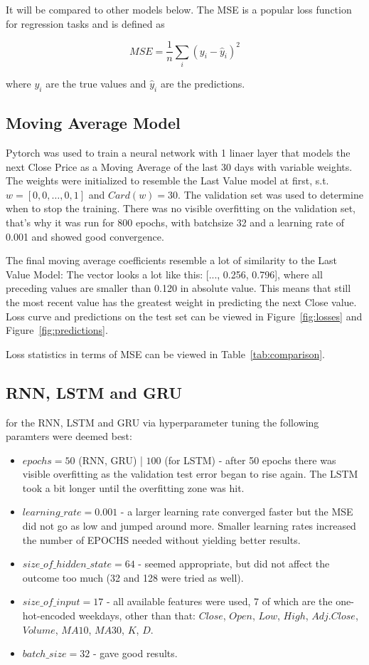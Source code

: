 \documentclass[utf8x]{ctexart}
\begin{document}
It will be compared to other models below.
The MSE is a popular loss function for regression tasks and is defined as

\[ MSE = \frac{1}{n} \sum_i{(y_i - \hat{y}_i)^2}\]

where $y_i$ are the true values and $\hat{y}_i$ are the predictions.

\subsection{Moving Average Model}

Pytorch was used to train a neural network with 1 linaer layer that models the next Close Price as a Moving Average of the last 30 days with variable weights. The weights were initialized to resemble the Last Value model at first, s.t. $w = [0,0,\dots,0,1]$ and $Card(w) = 30$. The validation set was used to determine when to stop the training. There was no visible overfitting on the validation set, that's why it was run for 800 epochs, with batchsize 32 and a learning rate of 0.001 and showed good convergence.

The final moving average coefficients resemble a lot of similarity to the Last Value Model: The vector looks a lot like this: [..., 0.256, 0.796], where all preceding values are smaller than 0.120 in absolute value. This means that still the most recent value has the greatest weight in predicting the next Close value.
Loss curve and predictions on the test set can be viewed in Figure~\ref{fig:losses} and Figure~\ref{fig:predictions}.

Loss statistics in terms of MSE can be viewed in Table~\ref{tab:comparison}.

\subsection{RNN, LSTM and GRU}

for the RNN, LSTM and GRU via hyperparameter tuning the following paramters were deemed best:
\begin{itemize}
  \item $epochs = 50$ (RNN, GRU) | $100$ (for LSTM) - after 50 epochs there was visible overfitting as the validation test error began to rise again. The LSTM took a bit longer until the overfitting zone was hit.
  \item $learning\_rate = 0.001$ - a larger learning rate converged faster but the MSE did not go as low and jumped around more. Smaller learning rates increased the number of EPOCHS needed without yielding better results.
  \item $size\_of\_hidden\_state = 64$ - seemed appropriate, but did not affect the outcome too much (32 and 128 were tried as well).
  \item $size\_of\_input = 17$ - all available features were used, 7 of which are the one-hot-encoded weekdays, other than that: $Close$, $Open$, $Low$, $High$, $Adj.Close$, $Volume$, $MA10$, $MA30$, $K$, $D$.
  \item $batch\_size = 32 $ - gave good results.
\end{itemize}
\end{document}
